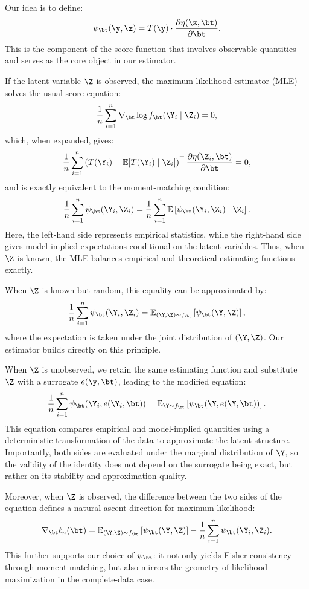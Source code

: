 Our idea is to define:
\[
\psi_\bt(\y, \z) = T(\y) \cdot \frac{\partial \eta(\z, \bt)}{\partial \bt}.
\]
This is the component of the score function that involves observable quantities and serves as the core object in our estimator.

If the latent variable \(\Z\) is observed, the maximum likelihood estimator (MLE) solves the usual score equation:
\[
\frac{1}{n} \sum_{i=1}^n \nabla_\bt \log f_\bt(\Y_i \mid \Z_i) = 0,
\]
which, when expanded, gives:
\[
\frac{1}{n} \sum_{i=1}^n \left( T(\Y_i) - \mathbb{E}[T(\Y_i) \mid \Z_i] \right)^\top \frac{\partial \eta(\Z_i, \bt)}{\partial \bt} = 0,
\]
and is exactly equivalent to the moment-matching condition:
\[
\frac{1}{n} \sum_{i=1}^n \psi_\bt(\Y_i, \Z_i)
=
\frac{1}{n} \sum_{i=1}^n \mathbb{E}\left[ \psi_\bt(\Y_i, \Z_i) \mid \Z_i \right].
\]
Here, the left-hand side represents empirical statistics, while the right-hand side gives model-implied expectations conditional on the latent variables. Thus, when \(\Z\) is known, the MLE balances empirical and theoretical estimating functions exactly.

When \(\Z\) is known but random, this equality can be approximated by:
\[
\frac{1}{n} \sum_{i=1}^n \psi_\bt(\Y_i, \Z_i)
= \mathbb{E}_{(\Y, \Z) \sim f_\bt}\left[ \psi_\bt(\Y, \Z) \right],
\]
where the expectation is taken under the joint distribution of \((\Y, \Z)\). Our estimator builds directly on this principle.

When \(\Z\) is unobserved, we retain the same estimating function and substitute \(\Z\) with a surrogate \( e(\y, \bt) \), leading to the modified equation:
\[
\frac{1}{n} \sum_{i=1}^n \psi_\bt(\Y_i, e(\Y_i, \bt)) 
=
\mathbb{E}_{\Y \sim f_\bt} \left[ \psi_\bt(\Y, e(\Y, \bt)) \right].
\]
This equation compares empirical and model-implied quantities using a deterministic transformation of the data to approximate the latent structure. Importantly, both sides are evaluated under the marginal distribution of \(\Y\), so the validity of the identity does not depend on the surrogate being exact, but rather on its stability and approximation quality.

Moreover, when \(\Z\) is observed, the difference between the two sides of the equation defines a natural ascent direction for maximum likelihood:
\[
\nabla_\bt \ell_n(\bt) 
= 
\mathbb{E}_{(\Y, \Z) \sim f_\bt} \left[ \psi_\bt(\Y, \Z) \right] 
- 
\frac{1}{n} \sum_{i=1}^n \psi_\bt(\Y_i, \Z_i).
\]
This further supports our choice of \(\psi_\bt\): it not only yields Fisher consistency through moment matching, but also mirrors the geometry of likelihood maximization in the complete-data case.

